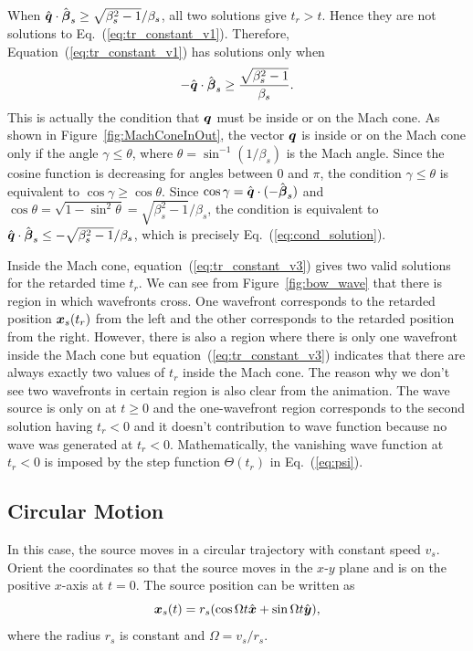 \documentclass[12pt]{article}
\newcommand \beq {\begin{equation}}
\newcommand \eeq {\end{equation}}
\newcommand{\ve}[1]{\mbox{\boldmath $#1$}}
\begin{document}
When $\hat{\ve{q}}\cdot \hat{\ve{\beta}}_s \geq \sqrt{\beta_s^2-1}/\beta_s$, all two 
solutions give $t_r>t$. Hence they are not solutions to Eq.~(\ref{eq:tr_constant_v1}). 
Therefore, Equation~(\ref{eq:tr_constant_v1}) has solutions only when 
\beq
  -\hat{\ve{q}}\cdot \hat{\ve{\beta}}_s \geq \frac{\sqrt{\beta_s^2-1}}{\beta_s} .
\label{eq:cond_solution}
\eeq
This is actually the condition that $\ve{q}$ must be inside or on the Mach cone. 
As shown in Figure~\ref{fig:MachConeInOut}, the vector $\ve{q}$ is inside or on 
the Mach cone only if the angle $\gamma \leq \theta$, where $\theta=\sin^{-1} (1/\beta_s)$ 
is the Mach angle. Since the cosine function is decreasing for angles between 0 and $\pi$, 
the condition $\gamma \leq \theta$ is equivalent to $\cos \gamma \geq \cos \theta$. Since 
$\cos \gamma = \hat{\ve{q}} \cdot (-\hat{\ve{\beta}}_s)$ and $\cos \theta = \sqrt{1-\sin^2 \theta}=
\sqrt{\beta_s^2-1}/\beta_s$, the condition is equivalent to 
$\hat{\ve{q}}\cdot \hat{\ve{\beta}}_s \leq -\sqrt{\beta_s^2-1}/\beta_s$, which is precisely 
Eq.~(\ref{eq:cond_solution}). 

Inside the Mach cone, equation~(\ref{eq:tr_constant_v3}) gives two valid solutions 
for the retarded time $t_r$. We can see from Figure~\ref{fig:bow_wave} that there is 
region in which wavefronts cross. One wavefront corresponds to the retarded position 
$\ve{x}_s(t_r)$ from the left and the other corresponds to the retarded position 
from the right. However, there is also a region where there is only one wavefront 
inside the Mach cone but equation~(\ref{eq:tr_constant_v3}) indicates that there are 
always exactly two values of $t_r$ inside the Mach cone. The reason why we don't see 
two wavefronts in certain region is also clear from the animation. The wave source 
is only on at $t \geq 0$ and the one-wavefront region corresponds to the second 
solution having $t_r<0$ and it doesn't contribution to wave function because no 
wave was generated at $t_r<0$. Mathematically, the vanishing wave function 
at $t_r<0$ is imposed by the step function $\Theta(t_r)$ in Eq.~(\ref{eq:psi}). 

\subsection{Circular Motion}

In this case, the source moves in a circular trajectory with constant speed $v_s$. 
Orient the coordinates so that the source moves in the $x$-$y$ plane and is on the 
positive $x$-axis at $t=0$. The source position can be written as 
\beq
  \ve{x}_s(t) = r_s(\cos \Omega t \hat{\ve{x}} + \sin \Omega t \hat{\ve{y}}) ,
\eeq
where the radius $r_s$ is constant and $\Omega=v_s/r_s$.
\end{document}
